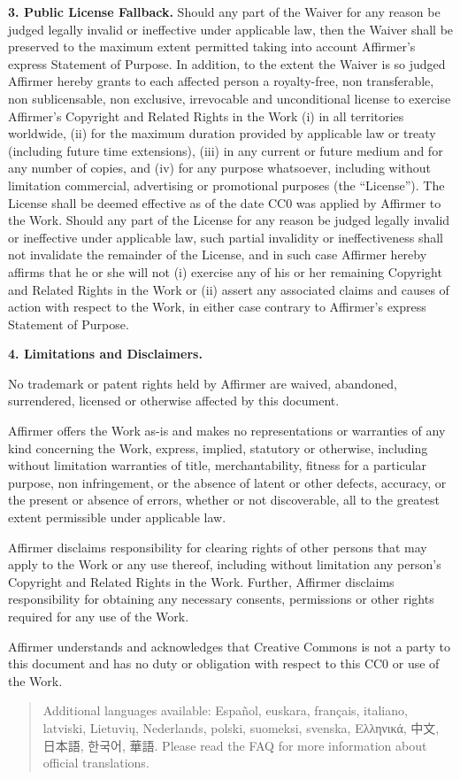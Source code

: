 \par \textbf{3. Public License Fallback.} Should any
part of the Waiver for any reason be judged legally invalid or
ineffective under applicable law, then the Waiver shall be
preserved to the maximum extent permitted taking into account
Affirmer's express Statement of Purpose. In addition, to the
extent the Waiver is so judged Affirmer hereby grants to each
affected person a royalty-free, non transferable, non
sublicensable, non exclusive, irrevocable and unconditional
license to exercise Affirmer's Copyright and Related Rights
in the Work (i) in all territories worldwide, (ii) for the
maximum duration provided by applicable law or treaty
(including future time extensions), (iii) in any current or
future medium and for any number of copies, and (iv) for any
purpose whatsoever, including without limitation commercial,
advertising or promotional purposes (the ``License''). The
License shall be deemed effective as of the date CC0 was
applied by Affirmer to the Work. Should any part of the
License for any reason be judged legally invalid or
ineffective under applicable law, such partial invalidity or
ineffectiveness shall not invalidate the remainder of the
License, and in such case Affirmer hereby affirms that he or
she will not (i) exercise any of his or her remaining
Copyright and Related Rights in the Work or (ii) assert any
associated claims and causes of action with respect to the
Work, in either case contrary to Affirmer's express Statement
of Purpose.
\par \textbf{4. Limitations and Disclaimers.}
\begin{doclicense@enumerate}
\item No trademark or patent rights held by Affirmer are
waived, abandoned, surrendered, licensed or otherwise
affected by this document.
\item Affirmer offers the Work as-is and makes no
representations or warranties of any kind concerning the
Work, express, implied, statutory or otherwise, including
without limitation warranties of title, merchantability,
fitness for a particular purpose, non infringement, or the
absence of latent or other defects, accuracy, or the present
or absence of errors, whether or not discoverable, all to
the greatest extent permissible under applicable law.
\item Affirmer disclaims responsibility for clearing rights of
other persons that may apply to the Work or any use thereof,
including without limitation any person's Copyright and
Related Rights in the Work. Further, Affirmer disclaims
responsibility for obtaining any necessary consents,
permissions or other rights required for any use of the
Work.
\item Affirmer understands and acknowledges that Creative
Commons is not a party to this document and has no duty or
obligation with respect to this CC0 or use of the Work.
\end{doclicense@enumerate}

\begin{quotation}Additional languages available: Español, euskara, français, italiano, latviski, Lietuvių, Nederlands, polski, suomeksi, svenska, Ελληνικά, 中文, 日本語, 한국어, 華語. Please read the FAQ for more information about official translations.\end{quotation}



